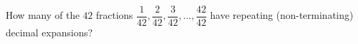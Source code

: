 How many of the $42$ fractions $\dfrac{1}{42},\dfrac{2}{42},\dfrac{3}{42},\dots,\dfrac{42}{42}$ have repeating (non-terminating) decimal expansions?
